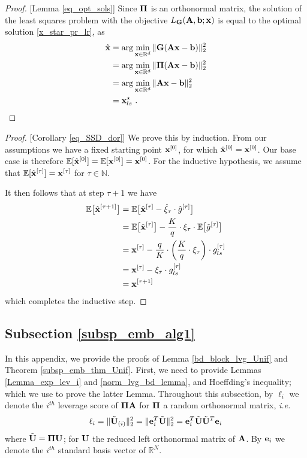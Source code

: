 \documentclass[journal,letterpaper,onecolumn,twoside,nofonttune]{IEEEtran}
\newcommand{\Ub}{\bold{U}}
\newcommand{\xb}{\bold{x}}
\newcommand{\xbh}{{\hat{\bold{x}}}}
\newcommand{\xih}{\hat{\xi}}
\newcommand{\Gb}{\bold{G}}
\newcommand{\Pibold}{\bold{\Pi}}
\newcommand{\R}{\mathbb{R}}
\newcommand{\E}{\mathbb{E}}
\newcommand{\N}{\mathbb{N}}
\newcommand{\gh}{\hat{g}}
\newcommand{\Ab}{\bold{A}}
\newcommand{\bb}{\bold{b}}
\newcommand{\eb}{\bold{e}}
\newcommand{\Ubt}{\tilde{\bold{U}}}
\begin{document}
\begin{proof}{[Lemma \ref{eq_opt_sols}]}
Since $\Pibold$ is an orthonormal matrix, the solution of the least squares problem with the objective $L_{\Gb}(\Ab,\bb;\xb)$ is equal to the optimal solution \eqref{x_star_pr_lr}, as
\begin{align*}
  \xbh &= \arg\min_{\xb\in\R^d}\|\Gb(\Ab\xb-\bb)\|_2^2 \\
  &= \arg\min_{\xb\in\R^d}\|\Pibold(\Ab\xb-\bb)\|_2^2 \\
  &= \arg\min_{\xb\in\R^d}\|\Ab\xb-\bb\|_2^2\\
  &= \xb_{ls}^{\star}\ .
\end{align*}
\end{proof}

\begin{proof}{[Corollary \ref{eq_SSD_dor}]}
We prove this by induction. From our assumptions we have a fixed starting point $\xb^{[0]}$, for which $\xbh^{[0]}=\xb^{[0]}$. Our base case is therefore $\E[\xbh^{[0]}]=\E[\xb^{[0]}]=\xb^{[0]}$. For the inductive hypothesis, we assume that $\E[\xbh^{[\tau]}]=\xb^{[\tau]}$ for $\tau\in\N$.

It then follows that at step $\tau+1$ we have
\begin{align*}
  \E\big[\xbh^{[\tau+1]}\big] &= \E\big[\xbh^{[\tau]}-\xih_{\tau}\cdot\gh^{[\tau]}\big]\\
  &= \E\big[\xbh^{[\tau]}\big]-\frac{K}{q}\cdot\xi_\tau\cdot\E\big[\gh^{[\tau]}\big]\\
  &= \xb^{[\tau]}-\frac{q}{K}\cdot\left(\frac{K}{q}\cdot\xi_\tau\right)\cdot g_{ls}^{[\tau]}\\
  &= \xb^{[\tau]}-\xi_\tau\cdot g_{ls}^{[\tau]}\\
  &= \xb^{[\tau+1]}
\end{align*}
which completes the inductive step.
\end{proof}

\subsection{Subsection \ref{subsp_emb_alg1}}

In this appendix, we provide the proofs of Lemma \ref{bd_block_lvg_Unif} and Theorem \ref{subsp_emb_thm_Unif}. First, we need to provide Lemmas \ref{Lemma_exp_lev_i} and \ref{norm_lvg_bd_lemma}, and Hoeffding's inequality; which we use to prove the latter Lemma. Throughout this subsection, by $\ell_i$ we denote the $i^{th}$ leverage score of $\Pibold\Ab$ for $\Pibold$ a random orthonormal matrix, \textit{i.e.}
\begin{equation}
\label{lvg_sc_expr}
  \ell_i=\|\Ubt_{(i)}\|_2^2=\|\eb_i^T\Ubt\|_2^2=\eb_i^T\Ubt\Ubt^T\eb_i
\end{equation}
where $\Ubt=\Pibold\Ub$; for $\Ub$ the reduced left orthonormal matrix of $\Ab$. By $\eb_i$ we denote the $i^{th}$ standard basis vector of $\R^N$.
\end{document}
